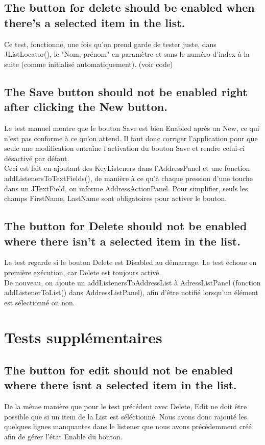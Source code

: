 \documentclass[a4paper,oneside,frenchb,12pt]{report}
\begin{document}
\subsection{The button for delete should be enabled when there's a selected item in the list.}
Ce test, fonctionne, une fois qu'on prend garde de tester juste, 
dans JListLocator(), le "Nom, prénom" en paramètre et sans le numéro 
d'index à la suite (comme initialisé automatiquement). (voir code)\\

\subsection{The Save button should not be enabled right after clicking the New button.}
Le test manuel montre que le bouton Save est bien Enabled après un New, 
ce qui n'est pas conforme à ce qu'on attend. Il faut donc corriger l'application pour que seule une modification entraîne l'activation du bouton Save et rendre celui-ci désactivé par défaut.\\

Ceci est fait en ajoutant des KeyListeners dans l'AddressPanel et une fonction 
addListenersToTextFields(), de manière à ce qu'à chaque pression d'une touche dans un JTextField, on informe AddressActionPanel. Pour simplifier, seuls les champs FirstName, LastName 
sont obligatoires pour activer le bouton.\\

\subsection{The button for Delete should not be enabled where there isn't a selected item in the list.}
Le test regarde si le bouton Delete est Disabled au démarrage. 
Le test échoue en première exécution, car Delete est toujours activé.\\

De nouveau, on ajoute un addListenersToAddressList à AdressListPanel 
(fonction addListenerToList() dans AddressListPanel), afin d'être notifié 
lorsqu'un élément est sélectionné ou non.

\section{Tests supplémentaires}

\subsection{The button for edit should not be enabled where there isnt a selected item in the list.}
De la même manière que pour le test précédent avec Delete, Edit ne doit être 
possible que si un item de la List est séléctionné. Nous avons donc rajouté 
les quelques lignes manquantes dans le listener que nous avons précédemment 
créé afin de gérer l'état Enable du bouton.
\end{document}
